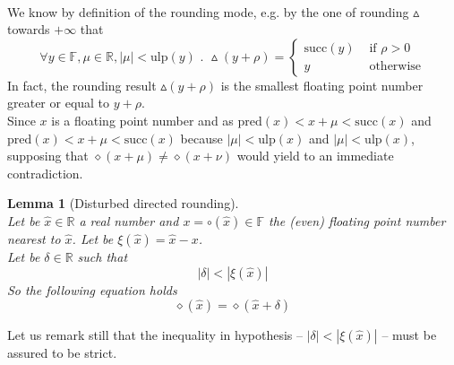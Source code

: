 \documentclass[a4paper,10pt,twoside]{article}
\newtheorem{lemma}[theorem]{Lemma}
\newenvironment{proof}[1][Proof]{\begin{trivlist}
\item[\hskip \labelsep {\bfseries #1}]}{\end{trivlist}}
\newcommand{\qed}{\nobreak \ifvmode \relax \else \ifdim \lastskip<1.5em \hskip-\lastskip
\hskip1.5em plus0em minus0.5em \fi \nobreak \vrule height0.75em width0.5em depth0.25em\fi}
\newcommand{\F}{\ensuremath{\mathbb {F}}}
\newcommand{\R}{\ensuremath{\mathbb {R}}}
\newcommand{\mUlp}{\ensuremath{\mathrm{ulp}}}
\renewcommand{\succ}{\ensuremath{\mathrm{succ}}}
\newcommand{\pred}{\ensuremath{\mathrm{pred}}}
\begin{document}
\begin{proof} ~ \\
We know by definition of the rounding mode, e.g. by the one of rounding $\vartriangle$ towards $+\infty$ that
$$\forall y \in \F, \mu \in \R, \left \vert \mu \right \vert < \mUlp\left( y \right) \mbox{ . }
\vartriangle \left( y + \rho \right) = \left \lbrace \begin{array}{ll} 
\succ\left(y\right) & \mbox{ if } \rho > 0 \\
y & \mbox{ otherwise}
\end{array} \right. $$
In fact, the rounding result $\vartriangle\left( y + \rho \right)$ is the smallest floating point number greater or equal 
to 
$y + \rho$. \\
Since $x$ is a floating point number and as 
$\pred\left( x \right) < x + \mu < \succ\left( x \right)$ and $\pred\left( x \right) < x + \mu < \succ\left( x \right)$ 
because $\left \vert \mu \right \vert < \mUlp\left( x \right)$ and $\left \vert \mu \right \vert < \mUlp\left( x \right)$, 
supposing that $\diamond \left( x + \mu \right) \not = \diamond \left( x + \nu \right)$ would yield to an immediate contradiction.\qed
\end{proof}
\begin{lemma}[Disturbed directed rounding] \label{arrdirper} ~ \\
Let be $\hat{x} \in \R$ a real number and $x = \circ\left( \hat{x} \right) \in \F$ the (even) floating point number nearest to 
$\hat{x}$. 
Let be $\xi\left(\hat{x}\right) = \hat{x} - x$. \\
Let be $\delta \in \R$ such that
$$\left \vert \delta \right \vert < \left \vert \xi\left(\hat{x}\right) \right \vert$$
So the following equation holds 
$$\diamond \left( \hat{x} \right) = \diamond \left( \hat{x} + \delta \right)$$
\end{lemma}
Let us remark still that the inequality in hypothesis 
-- $\left \vert \delta \right \vert < \left \vert \xi\left( \hat{x} \right) \right \vert$ --
must be assured to be strict.
\end{document}
